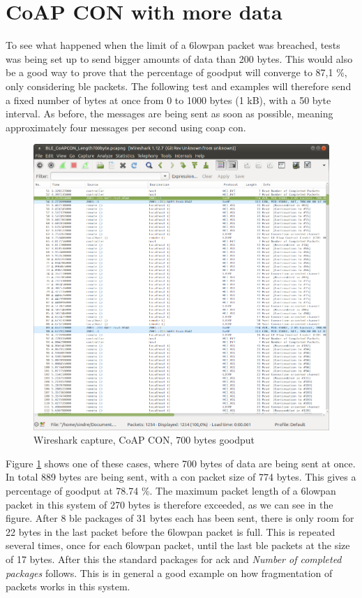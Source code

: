\section{CoAP CON with more data}

To see what happened when the limit of a \gls{6lowpan} packet was breached, tests was being set up to send bigger amounts of data than 200 bytes. This would also be a good way to prove that the percentage of goodput will converge to 87,1 \%, only considering \gls{ble} packets. The following test and examples will therefore send a fixed number of bytes at once from 0 to 1000 bytes (1 kB), with a 50 byte interval. As before, the messages are being sent as soon as possible, meaning approximately  four messages per second using \gls{coap} \gls{con}. 

\begin{figure}[ht]
    \centering
    \includegraphics[width=\textwidth]{Wireshark700bytes2.png}    
    \caption{Wireshark capture, CoAP CON, 700 bytes goodput}
    \label{fig:coapCON700Wireshark}
\end{figure}

Figure \ref{fig:coapCON700Wireshark} shows one of these cases, where 700 bytes of data are being sent at once. In total 889 bytes are being sent, with a \gls{con} packet size of 774 bytes. This gives a percentage of goodput at 78.74 \%. The maximum packet length of a \gls{6lowpan} packet in this system of 270 bytes is therefore exceeded, as we can see in the figure. After 8 \gls{ble} packages of 31 bytes each has been sent, there is only room for 22 bytes in the last packet before the \gls{6lowpan} packet is full. This is repeated several times, once for each \gls{6lowpan} packet, until the last \gls{ble} packets at the size of 17 bytes. After this the standard packages for \gls{ack} and \textit{Number of completed packages} follows. This is in general a good example on how fragmentation of packets works in this system. 


